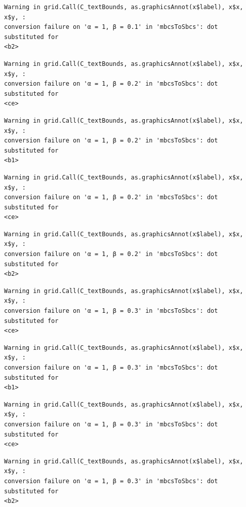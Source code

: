 \documentclass[
  spanish,
  a4paper,
]{scrreport}
\theoremstyle{plain}
\theoremstyle{definition}
\theoremstyle{definition}
\theoremstyle{remark}
\begin{document}
\begin{verbatim}
Warning in grid.Call(C_textBounds, as.graphicsAnnot(x$label), x$x, x$y, :
conversion failure on 'α = 1, β = 0.1' in 'mbcsToSbcs': dot substituted for
<b2>
\end{verbatim}

\begin{verbatim}
Warning in grid.Call(C_textBounds, as.graphicsAnnot(x$label), x$x, x$y, :
conversion failure on 'α = 1, β = 0.2' in 'mbcsToSbcs': dot substituted for
<ce>
\end{verbatim}

\begin{verbatim}
Warning in grid.Call(C_textBounds, as.graphicsAnnot(x$label), x$x, x$y, :
conversion failure on 'α = 1, β = 0.2' in 'mbcsToSbcs': dot substituted for
<b1>
\end{verbatim}

\begin{verbatim}
Warning in grid.Call(C_textBounds, as.graphicsAnnot(x$label), x$x, x$y, :
conversion failure on 'α = 1, β = 0.2' in 'mbcsToSbcs': dot substituted for
<ce>
\end{verbatim}

\begin{verbatim}
Warning in grid.Call(C_textBounds, as.graphicsAnnot(x$label), x$x, x$y, :
conversion failure on 'α = 1, β = 0.2' in 'mbcsToSbcs': dot substituted for
<b2>
\end{verbatim}

\begin{verbatim}
Warning in grid.Call(C_textBounds, as.graphicsAnnot(x$label), x$x, x$y, :
conversion failure on 'α = 1, β = 0.3' in 'mbcsToSbcs': dot substituted for
<ce>
\end{verbatim}

\begin{verbatim}
Warning in grid.Call(C_textBounds, as.graphicsAnnot(x$label), x$x, x$y, :
conversion failure on 'α = 1, β = 0.3' in 'mbcsToSbcs': dot substituted for
<b1>
\end{verbatim}

\begin{verbatim}
Warning in grid.Call(C_textBounds, as.graphicsAnnot(x$label), x$x, x$y, :
conversion failure on 'α = 1, β = 0.3' in 'mbcsToSbcs': dot substituted for
<ce>
\end{verbatim}

\begin{verbatim}
Warning in grid.Call(C_textBounds, as.graphicsAnnot(x$label), x$x, x$y, :
conversion failure on 'α = 1, β = 0.3' in 'mbcsToSbcs': dot substituted for
<b2>
\end{verbatim}
\end{document}
